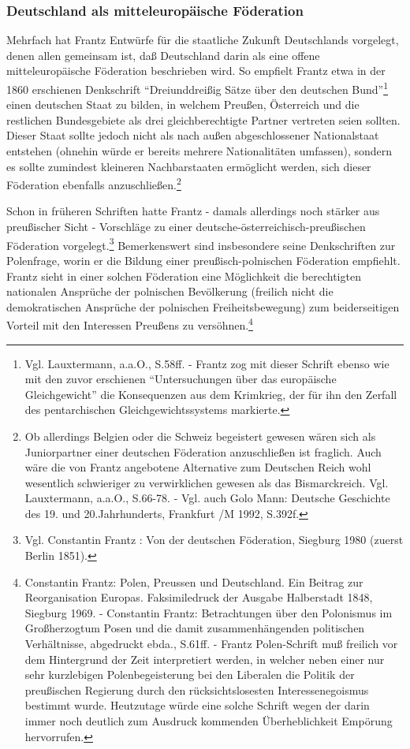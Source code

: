 \documentclass[a4paper,12pt]{article}
\begin{document}
\subsubsection{Deutschland als mitteleuropäische Föderation}

Mehrfach hat Frantz Entwürfe für die staatliche Zukunft
Deutschlands vorgelegt, denen allen gemeinsam ist, daß Deutschland
darin als eine offene mitteleuropäische Föderation beschrieben
wird. So empfielt Frantz etwa in der 1860 erschienen Denkschrift
"`Dreiunddreißig Sätze über den deutschen
Bund"'\footnote{Vgl. Lauxtermann, a.a.O., S.58ff. - Frantz zog mit
dieser Schrift ebenso wie mit den zuvor erschienen "`Untersuchungen
über das europäische Gleichgewicht"' die Konsequenzen aus dem
Krimkrieg, der für ihn den Zerfall des pentarchischen
Gleichgewichtssystems markierte.} einen deutschen Staat zu bilden,
in welchem Preußen, Österreich und die restlichen Bundesgebiete als
drei gleichberechtigte Partner vertreten seien sollten. Dieser
Staat sollte jedoch nicht als nach außen abgeschlossener
Nationalstaat entstehen (ohnehin würde er bereits mehrere
Nationalitäten umfassen), sondern es sollte zumindest kleineren
Nachbarstaaten ermöglicht werden, sich dieser Föderation ebenfalls
anzuschließen.\footnote{Ob allerdings Belgien oder die Schweiz
begeistert gewesen wären sich als Juniorpartner einer deutschen
Föderation anzuschließen ist fraglich. Auch wäre die von Frantz
angebotene Alternative zum Deutschen Reich wohl wesentlich
schwieriger zu verwirklichen gewesen als das
Bismarckreich. Vgl. Lauxtermann\cite{lauxtermann}, a.a.O.,
S.66-78. - Vgl. auch Golo Mann\cite{mann}: Deutsche Geschichte des
19. und 20.Jahrhunderts, Frankfurt /M 1992, S.392f.}

Schon in früheren Schriften hatte Frantz - damals allerdings noch
stärker aus preußischer Sicht - Vorschläge zu einer
deutsche-österreichisch-preußischen Föderation
vorgelegt.\footnote{Vgl. Constantin Frantz\cite{frantz-foederation}
: Von der deutschen Föderation, Siegburg 1980 (zuerst Berlin
1851).} Bemerkenswert sind insbesondere seine Denkschriften zur
Polenfrage, worin er die Bildung einer preußisch-polnischen
Föderation empfiehlt. Frantz sieht in einer solchen Föderation eine
Möglichkeit die berechtigten nationalen Ansprüche der polnischen
Bevölkerung (freilich nicht die demokratischen Ansprüche der
polnischen Freiheitsbewegung) zum beiderseitigen Vorteil mit den
Interessen Preußens zu versöhnen.\footnote{Constantin
Frantz\cite{frantz-polen}: Polen, Preussen und Deutschland. Ein
Beitrag zur Reorganisation Europas. Faksimiledruck der Ausgabe
Halberstadt 1848, Siegburg 1969. - Constantin Frantz: Betrachtungen
über den Polonismus im Großherzogtum Posen und die damit
zusammenhängenden politischen Verhältnisse, abgedruckt ebda.,
S.61ff. - Frantz Polen-Schrift muß freilich vor dem Hintergrund der
Zeit interpretiert werden, in welcher neben einer nur sehr
kurzlebigen Polenbegeisterung bei den Liberalen die Politik der
preußischen Regierung durch den rücksichtslosesten
Interessenegoismus bestimmt wurde. Heutzutage würde eine solche
Schrift wegen der darin immer noch deutlich zum Ausdruck kommenden
Überheblichkeit Empörung hervorrufen.}
\end{document}
